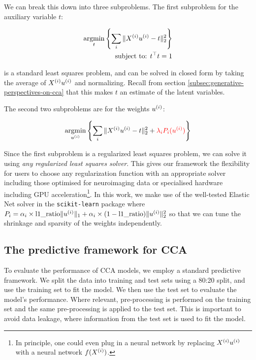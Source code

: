 We can break this down into three subproblems.
The first subproblem for the auxiliary variable \(t\):

\begin{align}
    \underset{t}{\mathrm{argmin}}\left\{\sum_i \|X^{(i)} u^{(i)} - t\|_2^2\right\}\\
    \text{subject to: }t^\top t = 1\\
\end{align}

is a standard least squares problem, and can be solved in closed form by taking the average of $X^{(i)} u^{(i)}$ and normalizing.
Recall from section \ref{subsec:generative-perspectives-on-cca} that this makes $t$ an estimate of the latent variables.

The second two subproblems are for the weights \(u^{(i)}\):

\begin{align}
    \underset{u^{(i)}}{\mathrm{argmin}}\left\{\sum_i \|X^{(i)} u^{(i)} - t\|_2^2 + \textcolor{red}{\lambda_i P_i(u^{(i)})} \right\}\\
\end{align}

Since the first subproblem is a regularized least squares problem, we can solve it using \textit{any regularized least squares solver}.
This gives our framework the flexibility for users to choose any regularization function with an appropriate solver including those optimised for neuroimaging data\citep{Nilearn_contributors_Nilearn} or specialised hardware including GPU acceleration\footnote{In principle, one could even plug in a neural network by replacing $X^{(i)} u^{(i)}$ with a neural network $f(X^{(i)})$.}.
In this work, we make use of the well-tested Elastic Net solver in the \texttt{scikit-learn} package \citep{pedregosa2011scikit} where $P_i=\alpha_i \times \text{l1\_ratio} \|u^{(i)}\|_1 + \alpha_i \times (1-\text{l1\_ratio}) \|u^{(i)}\|^2_2$ so that we can tune the shrinkage and sparsity of the weights independently.

\subsection{The predictive framework for CCA}

To evaluate the performance of CCA models, we employ a standard predictive framework.
We split the data into training and test sets using a 80:20 split, and use the training set to fit the model.
We then use the test set to evaluate the model's performance.
Where relevant, pre-processing is performed on the training set and the same pre-processing is applied to the test set.
This is important to avoid data leakage, where information from the test set is used to fit the model.

